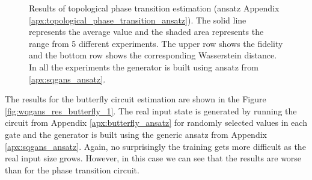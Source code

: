 \begin{figure}[htbp!]
  \caption{Results of topological phase transition estimation (ansatz Appendix \ref{apx:topological_phase_transition_ansatz}).
    The solid line represents the average value and the shaded area
    represents the range from 5 different experiments. The upper row shows the
    fidelity and the bottom row shows the corresponding Wasserstein distance. In all the
    experiments the generator is built using ansatz from \ref{apx:sqgans_ansatz}.}
  \label{fig:wqgans_res_1}
\end{figure}


The results for the butterfly circuit estimation are shown in the Figure
\ref{fig:wqgans_res_butterfly_1}. The real input state is generated by running
the circuit from Appendix \ref{apx:butterfly_ansatz} for randomly selected
values in each gate and the generator is built using the generic ansatz from Appendix
\ref{apx:sqgans_ansatz}. Again, no surprisingly the training gets more difficult
as the real input size grows. However, in this case we can see that the results
are worse than for the phase transition circuit.


